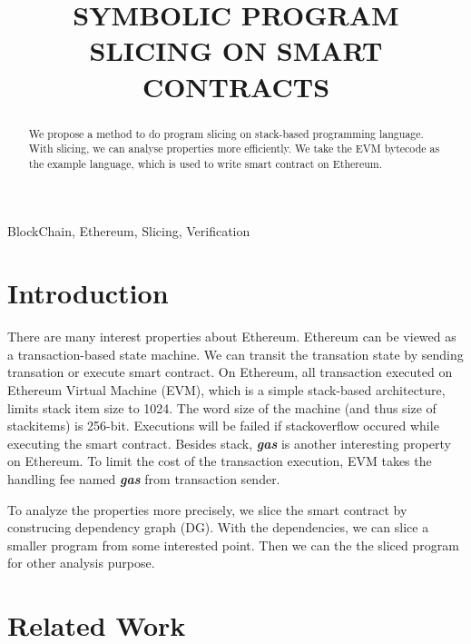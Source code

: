 \documentclass{article}
\title{SYMBOLIC PROGRAM SLICING ON SMART CONTRACTS}
\begin{document}
%

\maketitle

%

\begin{abstract}

  We propose a method to do program slicing on stack-based programming language. With slicing, we can analyse properties more efficiently. We take the EVM bytecode\cite{wood2014ethereum} as the example language, which is used to write smart contract\cite{szabo2003advances} on Ethereum\cite{wood2014ethereum}.

\end{abstract}

\begin{keywords}
  BlockChain, Ethereum, Slicing, Verification
\end{keywords}


\section{Introduction}
\label{sec:introduction}

There are many interest properties about Ethereum. Ethereum can be viewed as a transaction-based state machine. We can transit the transation state by sending transation or execute smart contract. On Ethereum, all transaction executed on Ethereum Virtual Machine (EVM), which is a simple stack-based architecture, limits stack item size to 1024. The word size of the machine (and thus size of stackitems) is 256-bit. Executions will be failed if stackoverflow occured while executing the smart contract. Besides stack, \textbf{\textit{gas}} is another interesting property on Ethereum. To limit the cost of the transaction execution, EVM takes the handling fee named \textbf{\textit{gas}} from transaction sender.

To analyze the properties more precisely, we slice the smart contract by construcing dependency graph (DG). With the dependencies, we can slice a smaller program from some interested point. Then we can the the sliced program for other analysis purpose.

\section{Related Work}
\label{sec:relatedwork}
\end{document}
